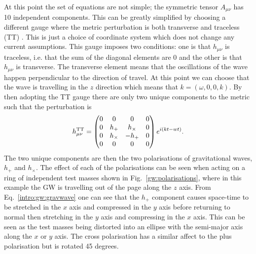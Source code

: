 At this point the set of equations are not simple; the symmetric tensor $A_{\mu \nu}$ has 10 independent
components. This can be greatly
simplified by choosing a different gauge where the metric perturbation is both
transverse and traceless (TT) \citep{flanagan2005BasicsGravitational}.  This is
just a choice of coordinate system which does not change any current
assumptions. This gauge imposes two conditions: one
is that $h_{\mu \nu}$ is traceless, i.e. that the sum of the diagonal elements
are 0 and the other is that $h_{\mu \nu}$ is transverse.  The transverse
element means that the oscillations of the wave happen perpendicular to the
direction of travel.  At this point we can choose that the wave is travelling in
the $z$ direction which means that $k = (\omega,0,0,k)$.  By then adopting the
TT gauge there are only two unique components to the metric such that the
perturbation is
\begin{equation}
\label{intro:gw:gravwave}
h_{\mu \nu}^{\rm{TT}} = \left( 
\begin{matrix}
0 & 0 & 0 & 0 \\
0 & h_{+} & h_{\times} & 0 \\
0 & h_{\times} & -h_{+} & 0 \\
0 & 0 & 0 & 0 \\
\end{matrix}
\right) 
e^{i(kt - wt)}.
\end{equation}
The two unique components are then the two polarisations of gravitational
waves, $h_{+}$ and $h_{\times}$. The effect of each of the polarisations can be seen when acting on a ring of independent test masses shown in Fig.~\ref{gw:polarisations}, where in this example the \gls{GW} is travelling out of the page along the $z$ axis.
From Eq.~\ref{intro:gw:gravwave} one can see that the $h_{+}$ component causes space-time to be stretched in the $x$ axis and compressed in the $y$ axis before returning to normal then stretching in the $y$ axis and compressing in the $x$ axis. This can be seen as the test masses being distorted into an ellipse with the semi-major axis along the $x$ or $y$ axis.
The cross polarisation has a similar affect to the plus polarisation but is rotated 45 degrees.
%

